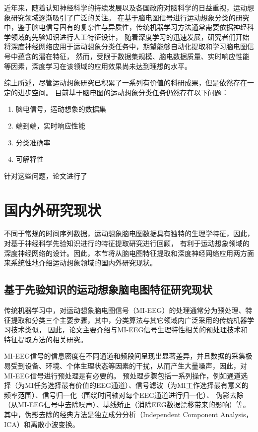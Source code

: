 近年来，随着认知神经科学的持续发展以及各国政府对脑科学的日益重视，运动想象研究领域逐渐吸引了广泛的关注。
在基于脑电图信号进行运动想象分类的研究中，鉴于脑电信号固有的复杂性与异质性，传统机器学习方法通常需要依据神经科学领域的先验知识进行人工特征设计，
随着深度学习的迅速发展，研究者们开始将深度神经网络应用于运动想象分类任务中，期望能够自动化提取和学习脑电图信号中蕴含的潜在特征，
然而，受限于数据集规模、脑电数据质量、实时响应性能等因素，深度学习在该领域的应用效果尚未达到理想的水平。

综上所述，尽管运动想象研究已积累了一系列有价值的科研成果，但是依然存在一定的进步空间。
目前基于脑电图的运动想象分类任务仍然存在以下问题：
\begin{enumerate}
    \item 脑电信号，运动想象的数据集
    \item 端到端，实时响应性能
    \item 分类准确率
    \item 可解释性
\end{enumerate}

针对这些问题，论文进行了

\section{国内外研究现状}

不同于常规的时间序列数据，运动想象脑电图数据具有独特的生理学特征，因此，对基于神经科学先验知识进行的特征提取研究进行回顾，
有利于运动想象领域的深度神经网络的设计。因此，本节将从脑电图特征提取和深度神经网络应用两方面来系统性地介绍运动想象领域的国内外研究现状。

\subsection{基于先验知识的运动想象脑电图特征研究现状}

传统机器学习中，对运动想象脑电图信号（MI-EEG）的处理通常分为预处理、特征提取和分类三个主要步骤\cite{altaheri2023deep}，其中，分类算法与其它领域内广泛采用的传统机器学习技术类似，
因此，论文主要介绍与MI-EEG信号生理特性相关的预处理技术和特征提取方法的相关研究。

MI-EEG信号的信息密度在不同通道和频段间呈现出显著差异，并且数据的采集极易受到设备、环境、个体生理状态等因素的干扰，从而产生大量噪声，因此，对MI-EEG信号进行预处理是有必要的。
预处理步骤包括一系列操作，例如通道选择（为MI任务选择最有价值的EEG通道）、信号滤波（为MI工作选择最有意义的频率范围）、信号归一化（围绕时间轴对每个EEG通道进行归一化）、
伪影去除（从MI-EEG信号中去除噪声）\cite{altaheri2023deep}、基线矫正（消除EEG数据漂移带来的影响）等。
其中，伪影去除的经典方法是独立成分分析（Independent Component Analysis，ICA）和离散小波变换\cite{sai2017automated}。

